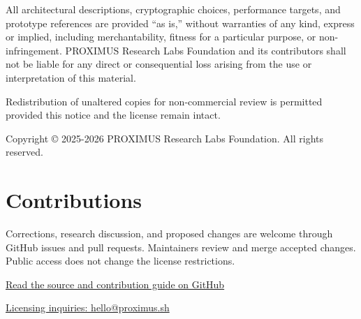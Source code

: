 \documentclass[10pt,a4paper]{article}
\begin{document}
All architectural descriptions, cryptographic choices, performance targets, and prototype references are provided ``as is,'' without warranties of any kind, express or implied, including merchantability, fitness for a particular purpose, or non-infringement. PROXIMUS Research Labs Foundation and its contributors shall not be liable for any direct or consequential loss arising from the use or interpretation of this material.


Redistribution of unaltered copies for non-commercial review is permitted provided this notice and the license remain intact.


Copyright \copyright{} 2025-2026 PROXIMUS Research Labs Foundation. All rights reserved.


\section*{Contributions}
Corrections, research discussion, and proposed changes are welcome through GitHub issues and pull requests. Maintainers review and merge accepted changes. Public access does not change the license restrictions.


\href{https://github.com/PROXIMUS-RESEARCH-LABS-FOUNDATION/proof-of-cipher-paper}{Read the source and contribution guide on GitHub}


\href{mailto:hello@proximus.sh}{Licensing inquiries: hello@proximus.sh}
\end{document}
